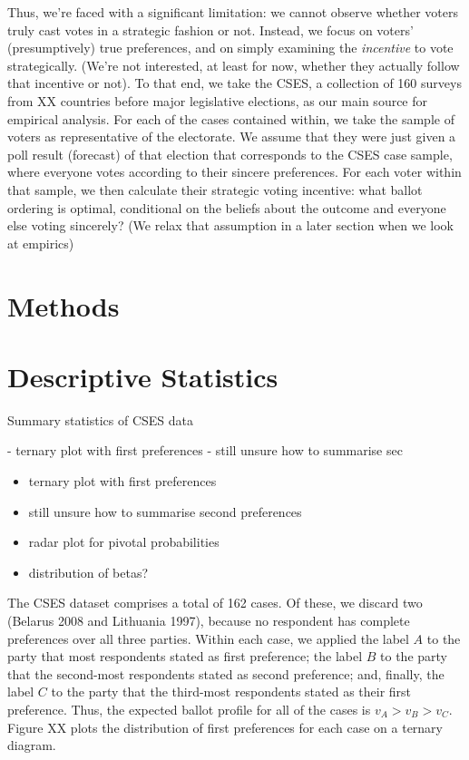 \documentclass[11pt, letter, margin = 2 in]{article}
\begin{document}
Thus, we're faced with a significant limitation: we cannot observe whether voters truly cast votes in a strategic fashion or not. Instead, we focus on voters' (presumptively) true preferences, and on simply examining the \textit{incentive} to vote strategically. (We're not interested, at least for now, whether they actually follow that incentive or not). To that end, we take the CSES, a collection of 160 surveys from XX countries before major legislative elections, as our main source for empirical analysis. For each of the cases contained within, we take the sample of voters as representative of the electorate. We assume that they were just given a poll result (forecast) of that election that corresponds to the CSES case sample, where everyone votes according to their sincere preferences. For each voter within that sample, we then calculate their strategic voting incentive: what ballot ordering is optimal, conditional on the beliefs about the outcome and everyone else voting sincerely? (We relax that assumption in a later section when we look at empirics)

\section{Methods}

\section{Descriptive Statistics}

Summary statistics of CSES data

- ternary plot with first preferences
- still unsure how to summarise sec

\begin{itemize}
\item ternary plot with first preferences
\item still unsure how to summarise second preferences
\item radar plot for pivotal probabilities
\item distribution of betas?
\end{itemize}

The CSES dataset comprises a total of 162 cases. Of these, we discard two (Belarus 2008 and Lithuania 1997), because no respondent has complete preferences over all three parties. Within each case, we applied the label $A$ to the party that most respondents stated as first preference; the label $B$ to the party that the second-most respondents stated as second preference; and, finally, the label $C$ to the party that the third-most respondents stated as their first preference. Thus, the expected ballot profile for all of the cases is $v_A > v_B > v_C$. Figure XX plots the distribution of first preferences for each case on a ternary diagram.
\end{document}
